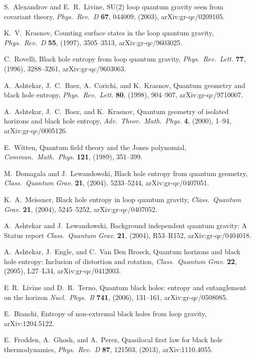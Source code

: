 \documentclass[12pt]{article}
\begin{document}
\begin{thebibliography}{999}
 S.\ Alexandrov and E.\ R.\ Livine, SU(2) loop 
quantum gravity seen from covariant theory, \emph{Phys.\ Rev.\ D}
{\bf 67}, 044009, (2003), arXiv:gr-qc/0209105.

  K.~V.\ Krasnov, Counting surface states in the 
loop quantum gravity, \emph{Phys.\ Rev.\ D} {\bf 55}, (1997),
3505--3513, arXiv:gr-qc/9603025.

  C.\ Rovelli, Black hole entropy from loop 
quantum gravity, \emph{Phys.\ Rev.\ Lett.} {\bf 77}, (1996),
3288--3261, arXiv:gr-qc/9603063.

 A.\ Ashtekar, J.~C.\ Baez, A.\ Corichi, and K.\ Krasnov,
Quantum geometry and black hole entropy, \emph{Phys.\ Rev.\ Lett.}
{\bf 80}, (1998), 904--907, arXiv:gr-qc/9710007.

 A.\ Ashtekar, J.~C.\ Baez, and K.\ Krasnov, 
Quantum geometry of isolated horizons and black hole entropy,
\emph{Adv.\ Theor.\ Math.\ Phys.} {\bf 4}, (2000), 1--94, 
arXiv:gr-qc/0005126.

 E.\ Witten, Quantum field theory and the
Jones polynomial, \emph{Commun.\ Math.\ Phys.} {\bf 121}, 
(1989), 351--399.

 M.\ Domagala and J.\ Lewandowski, Black hole 
entropy from quantum geometry, \emph{Class.\ Quantum Grav.}
{\bf 21}, (2004), 5233--5244, arXiv:gr-qc/0407051.

 K.~A.\ Meissner, Black hole entropy in loop 
quantum gravity, \emph{Class.\ Quantum Grav.} {\bf 21},
(2004),  5245--5252, arXiv:gr-qc/0407052. 

 A.\ Ashtekar and J.\ Lewandowski, 
Background independent quantum gravity: A Status report
\emph{Class.\ Quantum Grav.} {\bf 21}, (2004), R53--R152,
arXiv:gr-qc/0404018.

 A.\ Ashtekar, J.\ Engle, and C.\ Van Den Broeck,
Quantum horizons and black hole entropy: Inclusion of distortion 
and rotation, \emph{Class.\ Quantum Grav.} {\bf 22}, (2005),
L27--L34, arXiv:gr-qc/0412003.

 E~R.\ Livine and D.~R.\ Terno, Quantum 
black holes: entropy and entanglement on the horizon
\emph{Nucl.\ Phys.\ B} {\bf 741}, (2006), 131--161,
arXiv:gr-qc/0508085.

 E.\ Bianchi, Entropy of non-extremal black holes 
from loop gravity, arXiv:1204.5122.

 E.\ Frodden, A.\ Ghosh, and A.\ Perez, Quasilocal 
first law for black hole thermodynamics, \emph{Phys.\ Rev.\ D} {\bf 87}, 
121503, (2013), arXiv:1110.4055.


\end{thebibliography}
\end{document}
